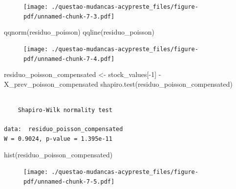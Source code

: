 \documentclass[
  letterpaper,
  DIV=11,
  numbers=noendperiod]{scrreprt}
\newenvironment{Shaded}{\begin{snugshade}}{\end{snugshade}}
\newcommand{\DecValTok}[1]{\textcolor[rgb]{0.68,0.00,0.00}{#1}}
\newcommand{\FunctionTok}[1]{\textcolor[rgb]{0.28,0.35,0.67}{#1}}
\newcommand{\NormalTok}[1]{\textcolor[rgb]{0.00,0.23,0.31}{#1}}
\newcommand{\OtherTok}[1]{\textcolor[rgb]{0.00,0.23,0.31}{#1}}
\newcommand{\SpecialCharTok}[1]{\textcolor[rgb]{0.37,0.37,0.37}{#1}}
\begin{document}
\begin{figure}[H]

{\centering \texttt{[image: ./questao-mudancas-acypreste\_files/figure-pdf/unnamed-chunk-7-3.pdf]}

}

\end{figure}

\begin{Shaded}
\begin{Highlighting}[]
\FunctionTok{qqnorm}\NormalTok{(residuo\_poisson)}
\FunctionTok{qqline}\NormalTok{(residuo\_poisson)}
\end{Highlighting}
\end{Shaded}

\begin{figure}[H]

{\centering \texttt{[image: ./questao-mudancas-acypreste\_files/figure-pdf/unnamed-chunk-7-4.pdf]}

}

\end{figure}

\begin{Shaded}
\begin{Highlighting}[]
\NormalTok{residuo\_poisson\_compensated }\OtherTok{\textless{}{-}}\NormalTok{ stock\_values[}\SpecialCharTok{{-}}\DecValTok{1}\NormalTok{] }\SpecialCharTok{{-}}\NormalTok{ X\_prev\_poisson\_compensated}
\FunctionTok{shapiro.test}\NormalTok{(residuo\_poisson\_compensated)}
\end{Highlighting}
\end{Shaded}

\begin{verbatim}

    Shapiro-Wilk normality test

data:  residuo_poisson_compensated
W = 0.9024, p-value = 1.395e-11
\end{verbatim}

\begin{Shaded}
\begin{Highlighting}[]
\FunctionTok{hist}\NormalTok{(residuo\_poisson\_compensated)}
\end{Highlighting}
\end{Shaded}

\begin{figure}[H]

{\centering \texttt{[image: ./questao-mudancas-acypreste\_files/figure-pdf/unnamed-chunk-7-5.pdf]}

}

\end{figure}
\end{document}
